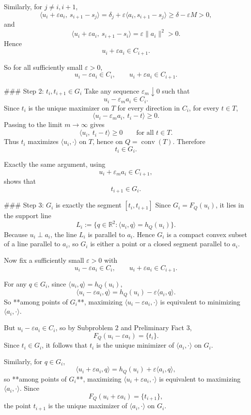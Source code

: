 Similarly, for \(j\neq i,i+1\),
\[
\langle u_i+\varepsilon a_i,\ s_{i+1}-s_j\rangle
=
\delta_j+\varepsilon\langle a_i,s_{i+1}-s_j\rangle
\ge \delta-\varepsilon M>0,
\]
and
\[
\langle u_i+\varepsilon a_i,\ s_{i+1}-s_i\rangle
=
\varepsilon\|a_i\|^2>0.
\]
Hence
\[
u_i+\varepsilon a_i\in C_{i+1}.
\]

So for all sufficiently small \(\varepsilon>0\),
\[
u_i-\varepsilon a_i\in C_i,
\qquad
u_i+\varepsilon a_i\in C_{i+1}.
\]

### Step 2: \(t_i,t_{i+1}\in G_i\)
Take any sequence \(\varepsilon_m\downarrow 0\) such that
\[
u_i-\varepsilon_m a_i\in C_i.
\]
Since \(t_i\) is the unique maximizer on \(T\) for every direction in \(C_i\), for every \(t\in T\),
\[
\langle u_i-\varepsilon_m a_i,\ t_i-t\rangle\ge 0.
\]
Passing to the limit \(m\to\infty\) gives
\[
\langle u_i,\ t_i-t\rangle\ge 0
\qquad \text{for all }t\in T.
\]
Thus \(t_i\) maximizes \(\langle u_i,\cdot\rangle\) on \(T\), hence on \(Q=\operatorname{conv}(T)\). Therefore
\[
t_i\in G_i.
\]

Exactly the same argument, using
\[
u_i+\varepsilon_m a_i\in C_{i+1},
\]
shows that
\[
t_{i+1}\in G_i.
\]

### Step 3: \(G_i\) is exactly the segment \([t_i,t_{i+1}]\)
Since \(G_i=F_Q(u_i)\), it lies in the support line
\[
L_i:=\{q\in\mathbb{R}^2:\langle u_i,q\rangle=h_Q(u_i)\}.
\]
Because \(u_i\perp a_i\), the line \(L_i\) is parallel to \(a_i\). Hence \(G_i\) is a compact convex subset of a line parallel to \(a_i\), so \(G_i\) is either a point or a closed segment parallel to \(a_i\).

Now fix a sufficiently small \(\varepsilon>0\) with
\[
u_i-\varepsilon a_i\in C_i,\qquad u_i+\varepsilon a_i\in C_{i+1}.
\]

For any \(q\in G_i\), since \(\langle u_i,q\rangle=h_Q(u_i)\),
\[
\langle u_i-\varepsilon a_i,q\rangle
=
h_Q(u_i)-\varepsilon\langle a_i,q\rangle.
\]
So **among points of \(G_i\)**, maximizing \(\langle u_i-\varepsilon a_i,\cdot\rangle\) is equivalent to minimizing \(\langle a_i,\cdot\rangle\).

But \(u_i-\varepsilon a_i\in C_i\), so by Subproblem \(2\) and Preliminary Fact \(3\),
\[
F_Q(u_i-\varepsilon a_i)=\{t_i\}.
\]
Since \(t_i\in G_i\), it follows that \(t_i\) is the unique minimizer of \(\langle a_i,\cdot\rangle\) on \(G_i\).

Similarly, for \(q\in G_i\),
\[
\langle u_i+\varepsilon a_i,q\rangle
=
h_Q(u_i)+\varepsilon\langle a_i,q\rangle,
\]
so **among points of \(G_i\)**, maximizing \(\langle u_i+\varepsilon a_i,\cdot\rangle\) is equivalent to maximizing \(\langle a_i,\cdot\rangle\). Since
\[
F_Q(u_i+\varepsilon a_i)=\{t_{i+1}\},
\]
the point \(t_{i+1}\) is the unique maximizer of \(\langle a_i,\cdot\rangle\) on \(G_i\).

